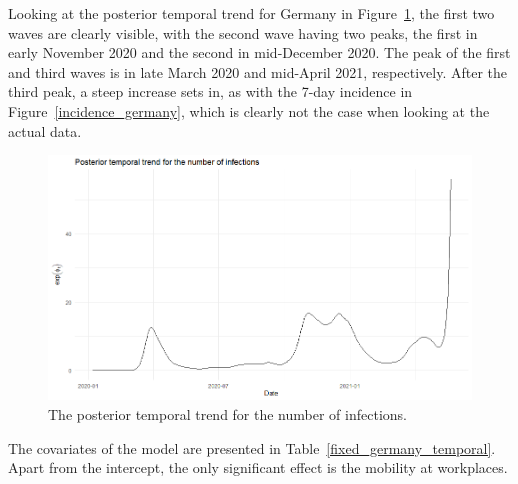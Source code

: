 Looking at the posterior temporal trend for Germany in Figure~\ref{trend_germany}, the first two waves are clearly visible, with the second wave having two peaks, the first in early November 2020 and the second in mid-December 2020. The peak of the first and third waves is in late March 2020 and mid-April 2021, respectively. After the third peak, a steep increase sets in, as with the 7-day incidence in Figure~\ref{incidence_germany}, which is clearly not the case when looking at the actual data.
\begin{figure}[H]
  \centering
  \includegraphics[width = \textwidth]{temp_trend_germany.png}  
  \caption{The posterior temporal trend for the number of infections.}
  \label{trend_germany}
\end{figure}
The covariates of the model are presented in Table~\ref{fixed_germany_temporal}. Apart from the intercept, the only significant effect is the mobility at workplaces.
